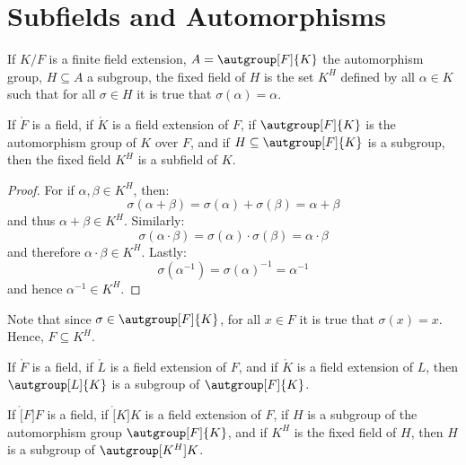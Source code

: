 \section{Subfields and Automorphisms}
    If $K/F$ is a finite field extension, $A=\autgroup[F]{K}$ the
    automorphism group, $H\subseteq{A}$ a subgroup, the fixed field of $H$
    is the set $K^{H}$ defined by all $\alpha\in{K}$ such that for all
    $\sigma\in{H}$ it is true that $\sigma(\alpha)=\alpha$.
    \begin{theorem}
        If $\ring{F}$ is a field, if $\ring{K}$ is a field extension of $F$,
        if $\autgroup[F]{K}$ is the automorphism group of $K$ over $F$,
        and if $H\subseteq\autgroup[F]{K}$ is a subgroup, then the fixed
        field $K^{H}$ is a subfield of $K$.
    \end{theorem}
    \begin{proof}
        For if $\alpha,\beta\in{K}^{H}$, then:
        \begin{equation}
            \sigma(\alpha+\beta)=\sigma(\alpha)+\sigma(\beta)
                =\alpha+\beta
        \end{equation}
        and thus $\alpha+\beta\in{K}^{H}$. Similarly:
        \begin{equation}
            \sigma(\alpha\cdot\beta)=\sigma(\alpha)\cdot\sigma(\beta)
                =\alpha\cdot\beta
        \end{equation}
        and therefore $\alpha\cdot\beta\in{K}^{H}$. Lastly:
        \begin{equation}
            \sigma(\alpha^{\minus{1}})=\sigma(\alpha)^{\minus{1}}
                =\alpha^{\minus{1}}
        \end{equation}
        and hence $\alpha^{\minus{1}}\in{K}^{H}$.
    \end{proof}
    Note that since $\sigma\in\autgroup[F]{K}$, for all $x\in{F}$ it is true
    that $\sigma(x)=x$. Hence, $F\subseteq{K}^{H}$.
    \begin{theorem}
        If $\ring{F}$ is a field, if $\ring{L}$ is a field extension of
        $F$, and if $\ring{K}$ is a field extension of $L$, then
        $\autgroup[L]{K}$ is a subgroup of $\autgroup[F]{K}$.
    \end{theorem}
    \begin{theorem}
        If $\ring[F]{F}$ is a field, if $\ring[K]{K}$ is a field extension
        of $F$, if $H$ is a subgroup of the automorphism group
        $\autgroup[F]{K}$, and if $K^{H}$ is the fixed field of $H$,
        then $H$ is a subgroup of $\autgroup[K^{H}]{K}$.
    \end{theorem}
